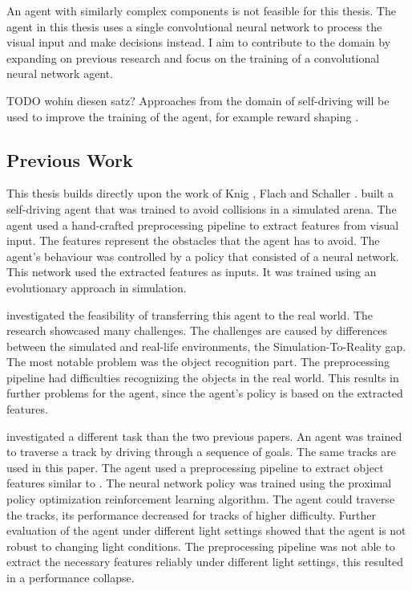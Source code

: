 An agent with similarly complex components is not feasible for this thesis. The agent in this thesis uses a single convolutional neural network to process the visual input and make decisions instead. I aim to contribute to the domain by expanding on previous research and focus on the training of a convolutional neural network agent. 


TODO wohin diesen satz?
Approaches from the domain of self-driving will be used to improve the training of the agent, for example reward shaping \textcite{drl_for_ad}.

\subsection{Previous Work}
This thesis builds directly upon the work of Knig \textcite{jonas_koenig}, Flach \textcite{merlin_flach} and Schaller \textcite{maximilian}. 
\textcite{jonas_koenig} built a self-driving agent that was trained to avoid collisions in a simulated arena. The agent used a hand-crafted preprocessing pipeline to extract features from visual input. The features represent the obstacles that the agent has to avoid. The agent's behaviour was controlled by a policy that consisted of a neural network. This network used the extracted features as inputs. It was trained using an evolutionary approach in simulation.

\textcite{merlin_flach} investigated the feasibility of transferring this agent to the real world. The research showcased many challenges. The challenges are caused by differences between the simulated and real-life environments, the Simulation-To-Reality gap. The most notable problem was the object recognition part. The preprocessing pipeline had difficulties recognizing the objects in the real world. This results in further problems for the agent, since the agent's policy is based on the extracted features.

\textcite{maximilian} investigated a different task than the two previous papers. An agent was trained to traverse a track by driving through a sequence of goals. The same tracks are used in this paper. The agent used a preprocessing pipeline to extract object features similar to \textcite{jonas_koenig}. The neural network policy was trained using the proximal policy optimization \textcite{ppo} reinforcement learning algorithm. The agent could traverse the tracks, its performance decreased for tracks of higher difficulty. Further evaluation of the agent under different light settings showed that the agent is not robust to changing light conditions. The preprocessing pipeline was not able to extract the necessary features reliably under different light settings, this resulted in a performance collapse.

